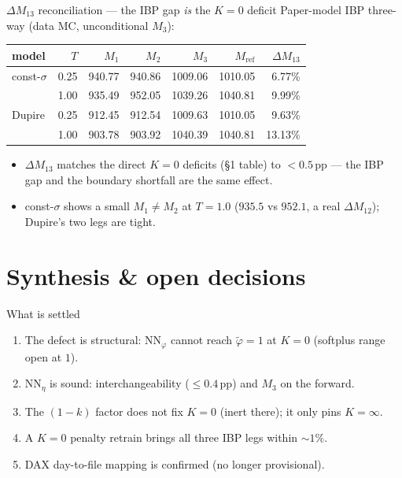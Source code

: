 \documentclass[aspectratio=169,11pt]{beamer}
\begin{document}
\begin{frame}{$\Delta M_{13}$ reconciliation --- the IBP gap \emph{is} the $K=0$ deficit}
  \footnotesize\centering
  Paper-model IBP three-way (data MC, unconditional $M_3$):\\[0.3em]
  \begin{tabular}{l r r r r r r}
    \toprule
    model & $T$ & $M_1$ & $M_2$ & $M_3$ & $M_{\mathrm{ref}}$ & $\Delta M_{13}$\\
    \midrule
    const-$\sigma$ & 0.25 & 940.77 & 940.86 & 1009.06 & 1010.05 & 6.77\%\\
                   & 1.00 & 935.49 & 952.05 & 1039.26 & 1040.81 & 9.99\%\\
    Dupire & 0.25 & 912.45 & 912.54 & 1009.63 & 1010.05 & 9.63\%\\
           & 1.00 & 903.78 & 903.92 & 1040.39 & 1040.81 & 13.13\%\\
    \bottomrule
  \end{tabular}
  \vspace{0.4em}
  \begin{itemize}\scriptsize
    \item $\Delta M_{13}$ matches the direct $K=0$ deficits (\S1 table) to $<0.5$\,pp --- the IBP gap and
          the boundary shortfall are the same effect.
    \item const-$\sigma$ shows a small $M_1\neq M_2$ at $T{=}1.0$ ($935.5$ vs $952.1$, a real $\Delta M_{12}$);
          Dupire's two legs are tight.
  \end{itemize}
\end{frame}

\section{Synthesis \& open decisions}

\begin{frame}{What is settled}
  \begin{enumerate}
    \item The defect is structural: $\mathrm{NN}_\varphi$ cannot reach $\tilde\varphi=1$ at $K=0$
          (softplus range open at $1$).
    \item $\mathrm{NN}_\eta$ is sound: interchangeability ($\le0.4$\,pp) and $M_3$ on the forward.
    \item The $(1-k)$ factor does not fix $K=0$ (inert there); it only pins $K=\infty$.
    \item A $K=0$ penalty retrain brings all three IBP legs within $\sim1\%$.
    \item DAX day-to-file mapping is confirmed (no longer provisional).
  \end{enumerate}
\end{frame}
\end{document}

